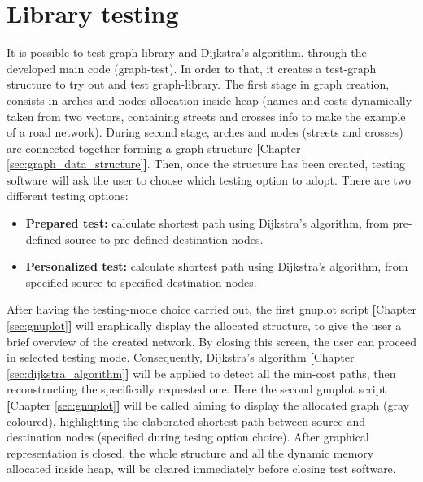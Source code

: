 \documentclass{article}                                                                                                     %
\begin{document}
\section{Library testing}                                                                                                   %
\label{sec:library_testing}                                                                                                 %
  It is possible to test graph-library and Dijkstra's algorithm, through the developed main code (graph-test). In order     %
  to that, it creates a test-graph structure to try out and test graph-library. The first stage in graph creation,
  consists in arches and nodes allocation inside heap (names and costs dynamically taken from two vectors, containing
  streets and crosses info to make the example of a road network). During second stage, arches and nodes (streets and
  crosses) are connected together forming a graph-structure \textbf{[}Chapter \ref{sec:graph_data_structure}\textbf{]}.
  Then, once the structure has been created, testing software will ask the user to choose which testing option to adopt.
  There are two different testing options:
  \begin{itemize}                                                                                                           %
    \item \textbf{Prepared test:}                                                                                           %
    calculate shortest path using Dijkstra's algorithm, from pre-defined source to pre-defined destination nodes.
    \item \textbf{Personalized test:}
    calculate shortest path using Dijkstra's algorithm, from specified source to specified destination nodes.
  \end{itemize}                                                                                                             %
  After having the testing-mode choice carried out, the first gnuplot script \textbf{[}Chapter \ref{sec:gnuplot}\textbf{]}
  will graphically display the allocated structure, to give the user a brief overview of the created network. By closing
  this screen, the user can proceed in selected testing mode. Consequently, Dijkstra's algorithm
  \textbf{[}Chapter \ref{sec:dijkstra_algorithm}\textbf{]} will be applied to detect all the min-cost paths, then
  reconstructing the specifically requested one. Here the second gnuplot script
  \textbf{[}Chapter \ref{sec:gnuplot}\textbf{]} will be called aiming to display the allocated graph (gray coloured),
  highlighting the elaborated shortest path between source and destination nodes (specified during tesing option choice).
  After graphical representation is closed, the whole structure and all the dynamic memory allocated inside heap, will
  be cleared immediately before closing test software.
\end{document}
